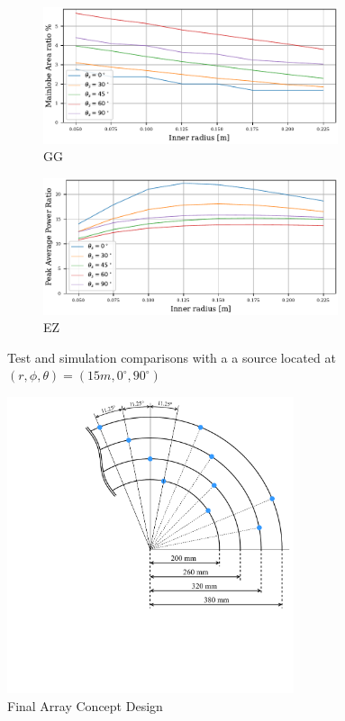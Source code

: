\begin{figure}[h!]
	\centering
	\begin{subfigure}[b]{1\textwidth}
		\centering
		\includegraphics[width=0.95\textwidth]{images/5_array_evaluation/final_flat_area.pdf}
		\caption{GG}
		\label{fig:finar}
	\end{subfigure}
	\begin{subfigure}[b]{1\textwidth}
		\centering
		\includegraphics[width=0.95\textwidth]{images/5_array_evaluation/final_flat_PAP.pdf}
		\caption{EZ}
		\label{fig:finpap}
	\end{subfigure}
	\caption{Test and simulation comparisons with a a source located at $(r, \phi, \theta) = (15m, 0^\circ, 90^\circ)$}
	\label{fig:finflat}
\end{figure}

\begin{figure}[h]
	\centering
	\includegraphics[width=0.75\textwidth, trim={5.5cm 6.0cm 0 0}]{images/5_array_evaluation/final_array_concept_design.pdf}
	\caption{Final Array Concept Design}
	\label{fig:final_array_concept_design}
\end{figure}


